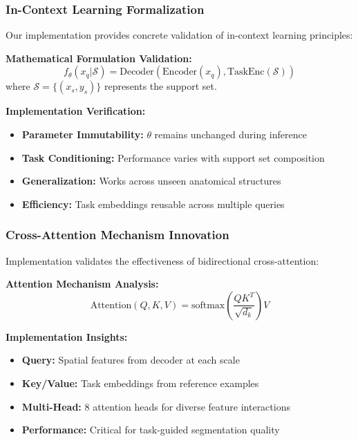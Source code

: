 \subsubsection*{In-Context Learning Formalization}
Our implementation provides concrete validation of in-context learning principles:

\textbf{Mathematical Formulation Validation:}
\begin{equation}
f_\theta(x_q | \mathcal{S}) = \text{Decoder}(\text{Encoder}(x_q), \text{TaskEnc}(\mathcal{S}))
\end{equation}
where $\mathcal{S} = \{(x_s, y_s)\}$ represents the support set.

\textbf{Implementation Verification:}
\begin{itemize}
    \item \textbf{Parameter Immutability:} $\theta$ remains unchanged during inference
    \item \textbf{Task Conditioning:} Performance varies with support set composition
    \item \textbf{Generalization:} Works across unseen anatomical structures
    \item \textbf{Efficiency:} Task embeddings reusable across multiple queries
\end{itemize}

\subsubsection*{Cross-Attention Mechanism Innovation}
Implementation validates the effectiveness of bidirectional cross-attention:

\textbf{Attention Mechanism Analysis:}
\begin{equation}
\text{Attention}(Q, K, V) = \text{softmax}\left(\frac{QK^T}{\sqrt{d_k}}\right)V
\end{equation}

\textbf{Implementation Insights:}
\begin{itemize}
    \item \textbf{Query:} Spatial features from decoder at each scale
    \item \textbf{Key/Value:} Task embeddings from reference examples
    \item \textbf{Multi-Head:} 8 attention heads for diverse feature interactions
    \item \textbf{Performance:} Critical for task-guided segmentation quality
\end{itemize}

